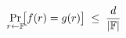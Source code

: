 \documentclass[preview]{standalone}
\begin{document}
\begin{align*}
\special{dvisvgm:raw <g id='unique000'>}\Pr_{r\leftarrow \mathbb{F}}\!\bigl[f(r) = g(r)\bigr] \;\leq\; \frac{d}{|\mathbb{F}|}\special{dvisvgm:raw </g>}
\end{align*}
\end{document}
